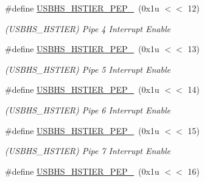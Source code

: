 \begin{DoxyCompactItemize}
\mbox{\label{group__SAMS70__USBHS_ga6c132fc69c3337e6671990fd1a7e991a}} 
\#define \mbox{\hyperlink{group__SAMS70__USBHS_ga6c132fc69c3337e6671990fd1a7e991a}{U\+S\+B\+H\+S\+\_\+\+H\+S\+T\+I\+E\+R\+\_\+\+P\+E\+P\+\_}}~(0x1u $<$$<$ 12)
\begin{DoxyCompactList}\small\item\em (U\+S\+B\+H\+S\+\_\+\+H\+S\+T\+I\+ER) Pipe 4 Interrupt Enable \end{DoxyCompactList}\item 
\mbox{\label{group__SAMS70__USBHS_ga6b87a486fa83e0611c5a4eb9d501f7b3}} 
\#define \mbox{\hyperlink{group__SAMS70__USBHS_ga6b87a486fa83e0611c5a4eb9d501f7b3}{U\+S\+B\+H\+S\+\_\+\+H\+S\+T\+I\+E\+R\+\_\+\+P\+E\+P\+\_}}~(0x1u $<$$<$ 13)
\begin{DoxyCompactList}\small\item\em (U\+S\+B\+H\+S\+\_\+\+H\+S\+T\+I\+ER) Pipe 5 Interrupt Enable \end{DoxyCompactList}\item 
\mbox{\label{group__SAMS70__USBHS_ga5e1680335266b023196d8eec97400876}} 
\#define \mbox{\hyperlink{group__SAMS70__USBHS_ga5e1680335266b023196d8eec97400876}{U\+S\+B\+H\+S\+\_\+\+H\+S\+T\+I\+E\+R\+\_\+\+P\+E\+P\+\_}}~(0x1u $<$$<$ 14)
\begin{DoxyCompactList}\small\item\em (U\+S\+B\+H\+S\+\_\+\+H\+S\+T\+I\+ER) Pipe 6 Interrupt Enable \end{DoxyCompactList}\item 
\mbox{\label{group__SAMS70__USBHS_ga788ce64d2afdf12459e1d2ae8899323d}} 
\#define \mbox{\hyperlink{group__SAMS70__USBHS_ga788ce64d2afdf12459e1d2ae8899323d}{U\+S\+B\+H\+S\+\_\+\+H\+S\+T\+I\+E\+R\+\_\+\+P\+E\+P\+\_}}~(0x1u $<$$<$ 15)
\begin{DoxyCompactList}\small\item\em (U\+S\+B\+H\+S\+\_\+\+H\+S\+T\+I\+ER) Pipe 7 Interrupt Enable \end{DoxyCompactList}\item 
\mbox{\label{group__SAMS70__USBHS_ga4b7e9566a64821243147c3950f3a60d5}} 
\#define \mbox{\hyperlink{group__SAMS70__USBHS_ga4b7e9566a64821243147c3950f3a60d5}{U\+S\+B\+H\+S\+\_\+\+H\+S\+T\+I\+E\+R\+\_\+\+P\+E\+P\+\_}}~(0x1u $<$$<$ 16)
$$
\end{DoxyCompactItemize}
